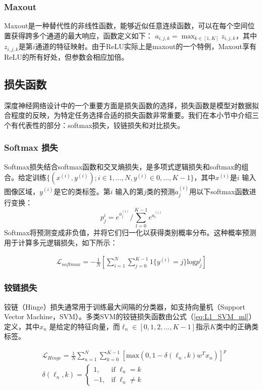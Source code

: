 \subsubsection{Maxout}
Maxout\cite{Goodfellow2014Generative}是一种替代性的非线性函数，能够近似任意连续函数，可以在每个空间位置获得跨多个通道的最大响应，函数定义如下：
$ a_{i,j,k}=\max_{k \in[1,K]}z_{i,j,k}$，其中$ z_{i,j,k} $是第$ i $通道的特征映射。由于ReLU实际上是maxout的一个特例，Maxout享有ReLU的所有好处，但参数会相应加倍。
\subsection{损失函数}
深度神经网络设计中的一个重要方面是损失函数的选择，损失函数是模型对数据拟合程度的反映，为特定任务选择合适的损失函数非常重要。我们在本小节中介绍三个有代表性的部分：softmax损失，铰链损失和对比损失。

\subsubsection{Softmax 损失}
Softmax损失结合softmax函数和交叉熵损失，是多项式逻辑损失和softmax的组合。给定训练$\{(x^{(i)}, y^{(i)}); i\in {1,\dots,N}, y^{(i)}\in {0,\dots,K-1}\}$，其中$ x ^ {(i)} $是$ i $ 输入图像区域，$ y^{(i)} $是它的类标签。第$ i $ 输入的第$ j $类的预测$ a_j ^ {(i)} $用以下softmax函数进行变换：
\begin{equation}
\label{eq:softmax}
p_j^{i} =e^{a_j^{(i)}}/{\sum_{l=0}^{K-1}e^{a_l^{(i)}}}
\end{equation}
Softmax将预测变成非负值，并将它们归一化以获得类别概率分布。这种概率预测用于计算多元逻辑损失，如下所示：

\begin{equation}
\label{eq:softmaxloss}
\begin{aligned}
\mathcal{L}_{softmax} =-\frac{1}{N}[\sum_{i=1}^{N}\sum_{j=0}^{K-1}1\{y^{(i)}=j\}\mathrm{log} p_j^{i}]
\end{aligned}
\end{equation}

\subsubsection{铰链损失}
铰链（Hinge）损失通常用于训练最大间隔的分类器，如支持向量机（Support Vector Machine，SVM）。多类SVM的铰链损失函数由公式（\ref{eq:L1_SVM_ml}）定义，其中$ x_n $ 是给定的特征向量，而$ \ell_n \in [0,1,2,...,K-1] $指示$ K $类中的正确类标签。

\begin{equation} \label{eq:L1_SVM_ml}
\begin{aligned}
& \mathcal{L}_{Hinge} =\frac{1}{N}\sum_{n=1}^{N}\sum_{k=0}^{K-1}[\mathrm{max}(0,1-\delta(\ell_n,k)w^T x_n)]^p  \\
& \delta(\ell_n,k)=
\begin{cases}
1, & \text{if $\ell_n = k$} \\
-1, & \text{if $\ell_n \ne k$}
\end{cases}
\end{aligned}
\end{equation}


